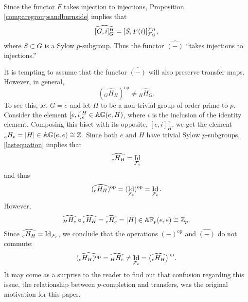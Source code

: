 \documentclass[10pt]{amsart}
\theoremstyle{definition}
\DeclareMathOperator{\Id}{Id}
\begin{document}
Since the functor $F$ takes injection to injections, Proposition \ref{comparegroupsandburnside} implies that
\begin{equation} \label{lastequation}
\widehat{[G,i]_{G}^{H}} = [S,F(i)]_{\mathcal{F}_G}^{\mathcal{F}_H},
\end{equation}
where $S \subset G$ is a Sylow $p$-subgroup. Thus the functor $\widehat{(-)}$ ``takes injections to injections.''
\begin{comment}
takes bisets of the form [G,i]_{G}^{H}, where $i$ is an injection, to bisets of the form
[S_1,i]_{\cF_1}^{\cF_2}, where i is an injection.
\end{comment}

It is tempting to assume that the functor $\widehat{(-)}$ will also preserve transfer maps. However, in general,
\[
(\widehat{{}_G H_H})^{\mathrm{op}} \neq \widehat{{}_H H_G}.
\]
To see this, let $G = e$ and let $H$ to be a non-trivial group of order prime to $p$. Consider the element $[e,i]_{e}^{H} \in \mathbb{A} \mathbb{G}(e,H)$, where $i$ is the inclusion of the identity element. Composing this biset with its opposite, $[e,i]_H^e$, we get the element ${}_{e}H_{e} = |H| \in \mathbb{A} \mathbb{G}(e,e)\cong \mathbb{Z}$. Since both $e$ and $H$ have trivial Sylow $p$-subgroups, \eqref{lastequation} implies that
\[
\widehat{_{e}H_{H}} = \Id_{\cF_e}
\]
and thus
\[
(\widehat{_{e}H_{H}})^{\mathrm{op}} = ( \Id_{\cF_e})^{\mathrm{op}} =  \Id_{\cF_e}.
\]
However,
\[
\widehat{_{H}H_{e}} \circ \widehat{_{e}H_{H}}  = \widehat{_{e}H_{e}} = |H| \in \mathbb{A} \mathbb{F}_p(e,e) \cong \mathbb{Z}_p.
\]
Since $\widehat{_{e}H_{H}} = \Id_{\cF_e}$, we conclude that the operations $(-)^{\mathrm{op}}$ and $\widehat{(-)}$ do not commute:
\[
\widehat{(_{e}H_{H})^{\mathrm{op}}} = \widehat{_{H}H_{e}}  \neq \Id_{\cF_e} = \bigl(\widehat{_e H_H}\bigr)^{\mathrm{op}}.
\]
It may come as a surprise to the reader to find out that confusion regarding this issue, the relationship between $p$-completion and transfers, was the original motivation for this paper.


\begin{bibdiv}
\begin{biblist}
\end{biblist}
\end{bibdiv}
\end{document}
